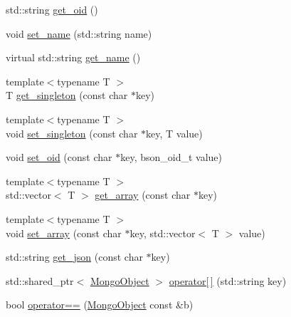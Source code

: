 \begin{DoxyCompactItemize}
std\+::string \hyperlink{class_mongo_object_ad155a8808f999f8e3dd0cfc055b33e2a}{get\+\_\+oid} ()
\item 
void \hyperlink{class_mongo_object_ac999ffe6b9b2ca261adff1eaf9da7e98}{set\+\_\+name} (std\+::string name)
\item 
virtual std\+::string \hyperlink{class_mongo_object_abd49d2dcea0ce5f49ebe9a8a9df97164}{get\+\_\+name} ()
\item 
{\footnotesize template$<$typename T $>$ }\\T \hyperlink{class_mongo_object_af0cf1568e5b1b87a971e93bba4ec0a40}{get\+\_\+singleton} (const char $\ast$key)
\item 
{\footnotesize template$<$typename T $>$ }\\void \hyperlink{class_mongo_object_a03a0d78b1f206aca81ff746edcd57c81}{set\+\_\+singleton} (const char $\ast$key, T value)
\item 
void \hyperlink{class_mongo_object_a9e80e38e5a4f40754ef48f2504e1613c}{set\+\_\+oid} (const char $\ast$key, bson\+\_\+oid\+\_\+t value)
\item 
{\footnotesize template$<$typename T $>$ }\\std\+::vector$<$ T $>$ \hyperlink{class_mongo_object_ae1002573afb58658162fb7f53cd0bffc}{get\+\_\+array} (const char $\ast$key)
\item 
{\footnotesize template$<$typename T $>$ }\\void \hyperlink{class_mongo_object_ac251f38eef739fb9e1418a20e7fcc7f7}{set\+\_\+array} (const char $\ast$key, std\+::vector$<$ T $>$ value)
\item 
std\+::string \hyperlink{class_mongo_object_a9f71ae755dac1db3e37cdee85329d163}{get\+\_\+json} (const char $\ast$key)
\item 
std\+::shared\+\_\+ptr$<$ \hyperlink{class_mongo_object}{Mongo\+Object} $>$ \hyperlink{class_mongo_object_a2136ceace181debba3d2c4fe07f947d8}{operator\mbox{[}$\,$\mbox{]}} (std\+::string key)
\item 
bool \hyperlink{class_mongo_object_a0050194f5bc8690e0db3b8217086e421}{operator==} (\hyperlink{class_mongo_object}{Mongo\+Object} const \&b)
\end{DoxyCompactItemize}
